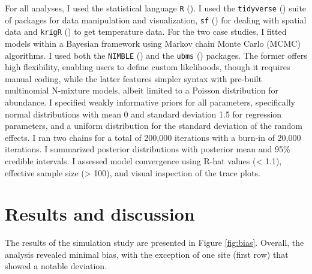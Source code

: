 \documentclass[
  11pt,
  a4paper,
]{article}
\begin{document}
For all analyses, I used the statistical language \texttt{R} (). I used the \texttt{tidyverse} () suite of packages for data manipulation and visualization, \texttt{sf} () for dealing with spatial data and \texttt{krigR} () to get temperature data. For the two case studies, I fitted models within a Bayesian framework using Markov chain Monte Carlo (MCMC) algorithms. I used both the \texttt{NIMBLE} () and the \texttt{ubms} () packages. The former offers high flexibility, enabling users to define custom likelihoods, though it requires manual coding, while the latter features simpler syntax with pre-built multinomial N-mixture models, albeit limited to a Poisson distribution for abundance. I specified weakly informative priors for all parameters, specifically normal distributions with mean 0 and standard deviation 1.5 for regression parameters, and a uniform distribution for the standard deviation of the random effects. I ran two chains for a total of 200,000 iterations with a burn-in of 20,000 iterations. I summarized posterior distributions with posterior mean and 95\% credible intervals. I assessed model convergence using R-hat values (\textless{} 1.1), effective sample size (\textgreater{} 100), and visual inspection of the trace plots.

\section{Results and discussion}\label{results-and-discussion}

The results of the simulation study are presented in Figure \ref{fig:bias}. Overall, the analysis revealed minimal bias, with the exception of one site (first row) that showed a notable deviation.
\end{document}
